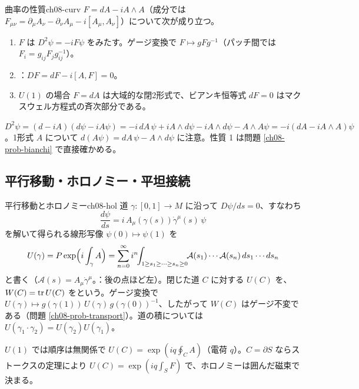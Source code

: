 \begin{mythm}{曲率の性質}{ch08-curv}
$F=dA-iA\wedge A$（成分では $F_{\mu\nu}=\partial_\mu A_\nu-\partial_\nu A_\mu-i[A_\mu,A_\nu]$）について次が成り立つ。
\begin{enumerate}
\item $F$ は $D^2\psi=-iF\psi$ をみたす。ゲージ変換で $F\mapsto gFg^{-1}$（パッチ間では $F_i=g_{ij}F_jg_{ij}^{-1}$）。
\item {}：$DF=dF-i[A,F]=0$。
\item $U(1)$ の場合 $F=dA$ は大域的な閉2形式で、ビアンキ恒等式 $dF=0$ はマクスウェル方程式の斉次部分である。
\end{enumerate}
\end{mythm}
\begin{note}
$D^2\psi=(d-iA)(d\psi-iA\psi)=-i\,dA\,\psi+iA\wedge d\psi-iA\wedge d\psi-A\wedge A\psi=-i(dA-iA\wedge A)\psi$。1形式 $A$ について $d(A\psi)=dA\,\psi-A\wedge d\psi$ に注意。性質 1 は問題 \ref{ch08-prob-bianchi} で直接確かめる。
\end{note}

\subsection{平行移動・ホロノミー・平坦接続}

\begin{mydef}{平行移動とホロノミー}{ch08-hol}
道 $\gamma\colon[0,1]\to M$ に沿って $D\psi/ds=0$、すなわち
\[
\frac{d\psi}{ds}=i\,A_\mu(\gamma(s))\dot\gamma^\mu(s)\,\psi
\]
を解いて得られる線形写像 $\psi(0)\mapsto\psi(1)$ を
\[
U(\gamma)=P\exp\Bigl(i\int_\gamma A\Bigr)=\sum_{n=0}^\infty i^n\!\!\int_{1\ge s_1\ge\cdots\ge s_n\ge0}\!\!\mathcal A(s_1)\cdots\mathcal A(s_n)\,ds_1\cdots ds_n
\]
と書く（$\mathcal A(s)=A_\mu\dot\gamma^\mu$。：後の点ほど左）。閉じた道 $C$ に対する $U(C)$ を、$W(C)=\tr U(C)$ をという。ゲージ変換で $U(\gamma)\mapsto g(\gamma(1))\,U(\gamma)\,g(\gamma(0))^{-1}$、したがって $W(C)$ はゲージ不変である（問題 \ref{ch08-prob-transport}）。道の積については $U(\gamma_1\cdot\gamma_2)=U(\gamma_2)U(\gamma_1)$。
\end{mydef}

$U(1)$ では順序は無関係で $U(C)=\exp(iq\oint_CA)$（電荷 $q$）。$C=\partial S$ ならストークスの定理により $U(C)=\exp(iq\int_SF)$ で、ホロノミーは囲んだ磁束で決まる。

